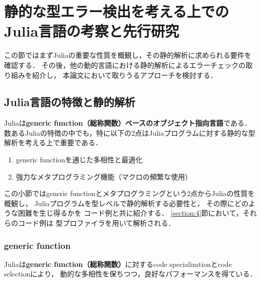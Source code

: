 
\section{静的な型エラー検出を考える上でのJulia言語の考察と先行研究} \label{section:2}

この節ではまずJuliaの重要な性質を概観し，その静的解析に求められる要件を確認する．
その後，他の動的言語における静的解析によるエラーチェックの取り組みを紹介し，
本論文において取りうるアプローチを検討する．


\subsection{Julia言語の特徴と静的解析} \label{subsection:2-1}

Juliaは\textbf{generic function（総称関数）ベースのオブジェクト指向言語}である\footnotemark．
数あるJuliaの特徴の中でも，特に以下の2点はJuliaプログラムに対する静的な型解析を考える上で重要である．

\begin{enumerate}
  \item generic functionを通じた多相性と最適化
  \item 強力なメタプログラミング機能（マクロの頻繁な使用）
\end{enumerate}

この小節ではgeneric functionとメタプログラミングという2点からJuliaの性質を概観し，
Juliaプログラムを型レベルで静的解析する必要性と，
その際にどのような困難を生じ得るかを
コード例と共に紹介する．
\ref{section:4}節において，それらのコード例は
型プロファイラを用いて解析される．


\subsubsection{generic function} \label{subsubsection:generic-function}

Juliaは\textbf{generic function（総称関数）}に対するcode specializationとcode selectionにより，
動的な多相性を保ちつつ，良好なパフォーマンスを得ている\cite{jeff-phd}．

